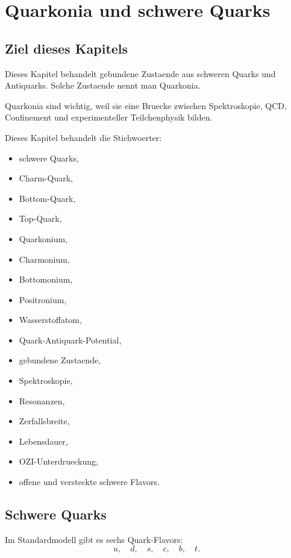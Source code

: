 \chapter{Quarkonia und schwere Quarks}

\section{Ziel dieses Kapitels}

Dieses Kapitel behandelt gebundene Zustaende aus schweren Quarks und Antiquarks.
Solche Zustaende nennt man Quarkonia.

Quarkonia sind wichtig, weil sie eine Bruecke zwischen Spektroskopie, QCD,
Confinement und experimenteller Teilchenphysik bilden.

\begin{notebox}
Dieses Kapitel behandelt die Stichwoerter:
\begin{itemize}
    \item schwere Quarks,
    \item Charm-Quark,
    \item Bottom-Quark,
    \item Top-Quark,
    \item Quarkonium,
    \item Charmonium,
    \item Bottomonium,
    \item Positronium,
    \item Wasserstoffatom,
    \item Quark-Antiquark-Potential,
    \item gebundene Zustaende,
    \item Spektroskopie,
    \item Resonanzen,
    \item Zerfallsbreite,
    \item Lebensdauer,
    \item OZI-Unterdrueckung,
    \item offene und versteckte schwere Flavors.
\end{itemize}
\end{notebox}

\section{Schwere Quarks}

Im Standardmodell gibt es sechs Quark-Flavors:
\[
    u,\quad d,\quad s,\quad c,\quad b,\quad t.
\]

